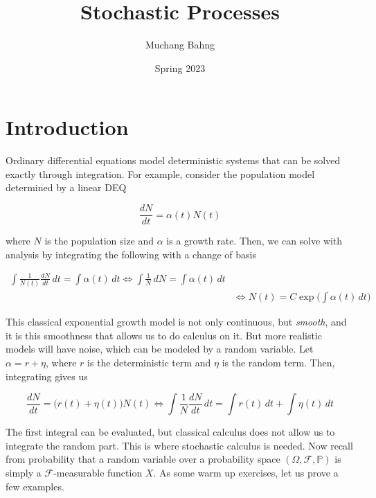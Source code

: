 \documentclass{article}
\theoremstyle{definition}
\theoremstyle{remark}
\theoremstyle{definition}
\begin{document}
\pagestyle{fancy}

\cfoot{\thepage / \pageref{LastPage}}

\title{Stochastic Processes}
\author{Muchang Bahng}
\date{Spring 2023}

\maketitle
\tableofcontents 
\pagebreak 

\section{Introduction}

  Ordinary differential equations model deterministic systems that can be solved exactly through integration. For example, consider the population model determined by a linear DEQ 

    \[\frac{d N} {dt} = \alpha(t) N (t)\]

  where $N$ is the population size and $\alpha$ is a growth rate. Then, we can solve with analysis by integrating the following with a change of basis

  \begin{align*}
    \int \frac{1}{N(t)} \frac{dN}{dt} \,dt = \int \alpha(t) \,dt \iff \int \frac{1}{N} \, dN = \int \alpha(t) \,dt \\
    & \iff N(t) = C \exp \bigg( \int \alpha (t) \,dt \bigg) 
  \end{align*}
  
  This classical exponential growth model is not only continuous, but \textit{smooth}, and it is this smoothness that allows us to do calculus on it. But more realistic models will have noise, which can be modeled by a random variable. Let $\alpha = r + \eta$, where $r$ is the deterministic term and $\eta$ is the random term. Then, integrating gives us 

    \[\frac{dN}{dt} = \big( r(t) + \eta(t) \big) N(t) \iff \int \frac{1}{N} \frac{dN}{dt} \,dt = \int r(t) \,dt + \int \eta(t) \,dt\]
    
  The first integral can be evaluated, but classical calculus does not allow us to integrate the random part. This is where stochastic calculus is needed. Now recall from probability that a random variable over a probability space $(\Omega, \mathcal{F}, \mathbb{P})$ is simply a $\mathcal{F}$-measurable function $X$. As some warm up exercises, let us prove a few examples. 
\end{document}
